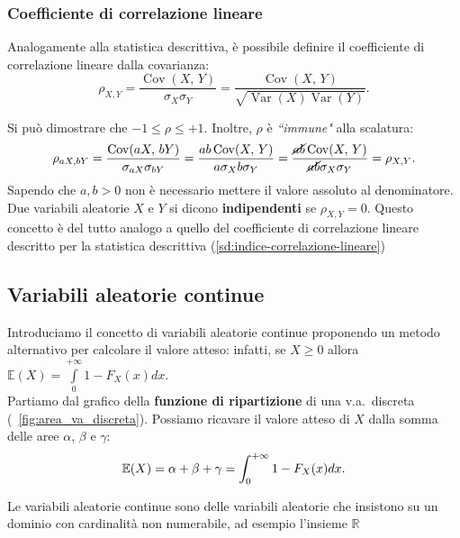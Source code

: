 \subsubsection{Coefficiente di correlazione lineare}
Analogamente alla statistica descrittiva, è possibile definire il coefficiente di correlazione lineare dalla covarianza: \[
\boxed{
\rho_{X,Y} = \frac{\operatorname{Cov}(X, \, Y)}{\sigma_X \sigma_Y} = \frac{\operatorname{Cov}(X, \, Y)}{\sqrt{\operatorname{Var}(X)\operatorname{Var}(Y)}} 
}.
\]

\noindent Si può dimostrare che $-1 \leq \rho \leq +1$. Inoltre, $\rho$ è \textit{``immune"} alla scalatura: \[
\rho_{aX,bY} = \frac{\operatorname{Cov}(aX, \, bY)}{\sigma_{aX} \sigma_{bY}} = 
\frac{ab\operatorname{Cov}(X, \, Y)}{a\sigma_{X}b \sigma_{Y}} = \frac{\cancel{ab}\operatorname{Cov}(X, \, Y)}{\cancel{ab}\sigma_{X} \sigma_{Y}} = \rho_{X,Y}.
\]
Sapendo che $a, b > 0$ non è necessario mettere il valore assoluto al denominatore. \\
Due variabili aleatorie $X$ e $Y$ si dicono \textbf{indipendenti} se $\rho_{X,Y}=0$.
Questo concetto è del tutto analogo a quello del coefficiente di correlazione lineare descritto per la statistica descrittiva (\ref{sd:indice-correlazione-lineare})

\subsection{Variabili aleatorie continue}
Introduciamo il concetto di variabili aleatorie continue proponendo un metodo alternativo per calcolare il valore atteso: infatti, se $X \geq 0$ allora $\mathbb{E}(X) = \int\limits_0^{+\infty}{1 - F_X(x)} dx$. \\
Partiamo dal grafico della \textbf{funzione di ripartizione} di una v.a.\  discreta (\figurename \ \ref{fig:area_va_discreta}). Possiamo ricavare il valore atteso di $X$ dalla somma delle aree $\alpha$, $\beta$ e $\gamma$: \[
\mathbb{E}(X) = \alpha + \beta + \gamma = \int_0^{+\infty}{1 - F_X(x)} dx.
\]

\noindent Le variabili aleatorie continue sono delle variabili aleatorie che insistono su un dominio con cardinalità non numerabile, ad esempio l'insieme $\mathbb R$


